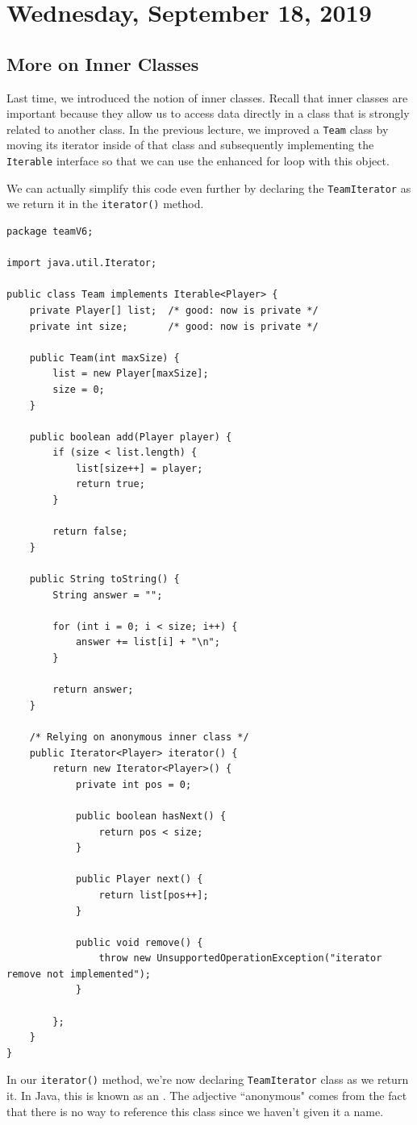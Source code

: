 \section{Wednesday, September 18, 2019}
\subsection{More on Inner Classes}
Last time, we introduced the notion of inner classes. Recall that inner classes are important because they allow us to access data directly in a class that is strongly related to another class. In the previous lecture, we improved a \verb!Team! class by moving its iterator inside of that class and subsequently implementing the \verb!Iterable! interface so that we can use the enhanced for loop with this object. 

We can actually simplify this code even further by declaring the \verb!TeamIterator! as we return it in the \verb!iterator()! method.

\begin{lstlisting}
package teamV6;

import java.util.Iterator;

public class Team implements Iterable<Player> {
	private Player[] list;  /* good: now is private */
	private int size;	    /* good: now is private */
	
	public Team(int maxSize) {
		list = new Player[maxSize];
		size = 0;
	}
	
	public boolean add(Player player) {
		if (size < list.length) {
			list[size++] = player;
			return true;
		}
		
		return false;
	}
	
	public String toString() {
		String answer = "";
		
		for (int i = 0; i < size; i++) { 
			answer += list[i] + "\n";
		}
		
		return answer;
	}

	/* Relying on anonymous inner class */
	public Iterator<Player> iterator() {
		return new Iterator<Player>() {
			private int pos = 0;
			
			public boolean hasNext() {
				return pos < size;
			}
			
			public Player next() {
				return list[pos++];
			}
			
			public void remove() {
				throw new UnsupportedOperationException("iterator remove not implemented");
			}
			
		};
	}
}
\end{lstlisting}
In our \verb!iterator()! method, we're now declaring \verb!TeamIterator! class as we return it. In Java, this is known as an . The adjective ``anonymous" comes from the fact that there is no way to reference this class since we haven't given it a name. 

